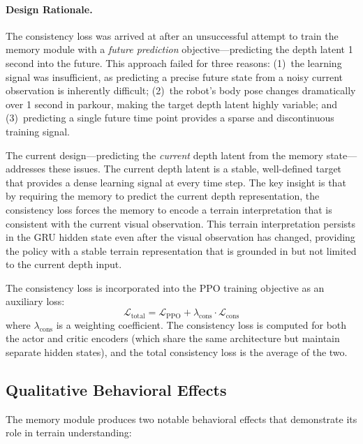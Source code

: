 \paragraph{Design Rationale.}
The consistency loss was arrived at after an unsuccessful attempt to train the memory module with a \emph{future prediction} objective---predicting the depth latent 1 second into the future. This approach failed for three reasons: (1)~the learning signal was insufficient, as predicting a precise future state from a noisy current observation is inherently difficult; (2)~the robot's body pose changes dramatically over 1 second in parkour, making the target depth latent highly variable; and (3)~predicting a single future time point provides a sparse and discontinuous training signal.

The current design---predicting the \emph{current} depth latent from the memory state---addresses these issues. The current depth latent is a stable, well-defined target that provides a dense learning signal at every time step. The key insight is that by requiring the memory to predict the current depth representation, the consistency loss forces the memory to encode a terrain interpretation that is consistent with the current visual observation. This terrain interpretation persists in the GRU hidden state even after the visual observation has changed, providing the policy with a stable terrain representation that is grounded in but not limited to the current depth input.

The consistency loss is incorporated into the PPO training objective as an auxiliary loss:
\begin{equation}
    \mathcal{L}_{\text{total}} = \mathcal{L}_{\text{PPO}} + \lambda_{\text{cons}} \cdot \mathcal{L}_{\text{cons}}
\end{equation}
where $\lambda_{\text{cons}}$ is a weighting coefficient. The consistency loss is computed for both the actor and critic encoders (which share the same architecture but maintain separate hidden states), and the total consistency loss is the average of the two.

\subsection{Qualitative Behavioral Effects}
\label{sec:memory_effects}

The memory module produces two notable behavioral effects that demonstrate its role in terrain understanding:

